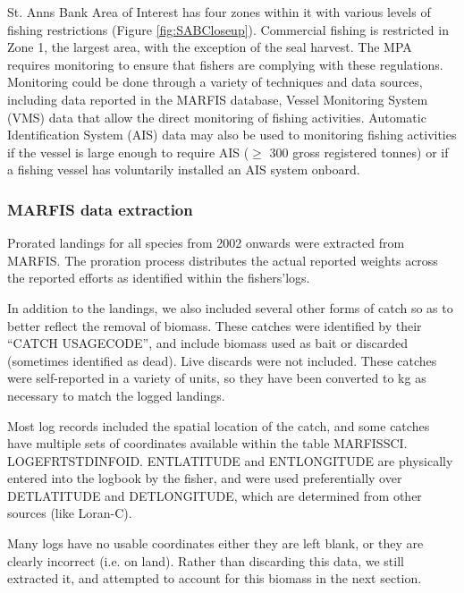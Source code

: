 \documentclass[letterpaper,portrait,11pt]{scrartcl}
\numberwithin{equation}{section}    %
\numberwithin{figure}{section}    %
\numberwithin{table}{section}       %
\begin{document}
St. Anns Bank Area of Interest has four zones within it with various levels of fishing restrictions (Figure \ref{fig:SABCloseup}). Commercial fishing is restricted in Zone 1, the largest area, with the exception of the seal harvest. The MPA requires monitoring to ensure that fishers are complying with these regulations. Monitoring could be done through a variety of techniques and data sources, including data reported in the MARFIS database, Vessel Monitoring System (VMS) data that allow the direct monitoring of fishing activities. Automatic Identification System (AIS) data may also be used to monitoring fishing activities if the vessel is large enough to require AIS ($\geq$ 300 gross registered tonnes) or if a fishing vessel has voluntarily installed an AIS system onboard.


\subsubsection{MARFIS data extraction}

Prorated landings for all species from 2002 onwards were extracted from MARFIS. The proration process distributes the actual reported weights across the reported efforts as identified within the fishers\textquoteright logs.

In addition to the landings, we also included several other forms of catch so as to better reflect the removal of biomass. These catches were identified by their \textquotedblleft CATCH \textunderscore USAGE\textunderscore CODE\textquotedblright, and include biomass used as bait or discarded (sometimes identified as dead).  Live discards were not included.  These catches were self-reported in a variety of units, so they have been converted to kg as necessary to match the logged landings.

Most log records included the spatial location of the catch, and some catches have multiple sets of coordinates available within the table MARFISSCI. LOG\textunderscore EFRT\textunderscore STD\textunderscore INFO\textunderscore ID.  ENT\textunderscore LATITUDE and ENT\textunderscore LONGITUDE are physically entered into the logbook by the fisher, and were used preferentially over DET\textunderscore LATITUDE  and DET\textunderscore LONGITUDE, which are determined from other sources (like Loran-C).

Many logs have no usable coordinates \textendash  either they are left blank, or they are clearly incorrect (i.e. on land).  Rather than discarding this data, we still extracted it, and attempted to account for this biomass in the next section.
\end{document}
